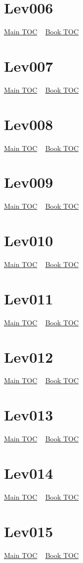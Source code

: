 \documentclass{book}
\begin{document}
  \section{Lev006}\hyperlink{toc}{Main TOC} ~ \hyperref[subsec:Lev]{Book TOC} 
  \section{Lev007}\hyperlink{toc}{Main TOC} ~ \hyperref[subsec:Lev]{Book TOC} 
  \section{Lev008}\hyperlink{toc}{Main TOC} ~ \hyperref[subsec:Lev]{Book TOC} 
  \section{Lev009}\hyperlink{toc}{Main TOC} ~ \hyperref[subsec:Lev]{Book TOC} 
  \section{Lev010}\hyperlink{toc}{Main TOC} ~ \hyperref[subsec:Lev]{Book TOC} 
  \section{Lev011}\hyperlink{toc}{Main TOC} ~ \hyperref[subsec:Lev]{Book TOC} 
  \section{Lev012}\hyperlink{toc}{Main TOC} ~ \hyperref[subsec:Lev]{Book TOC} 
  \section{Lev013}\hyperlink{toc}{Main TOC} ~ \hyperref[subsec:Lev]{Book TOC} 
  \section{Lev014}\hyperlink{toc}{Main TOC} ~ \hyperref[subsec:Lev]{Book TOC} 
  \section{Lev015}\hyperlink{toc}{Main TOC} ~ \hyperref[subsec:Lev]{Book TOC} 
\end{document}
